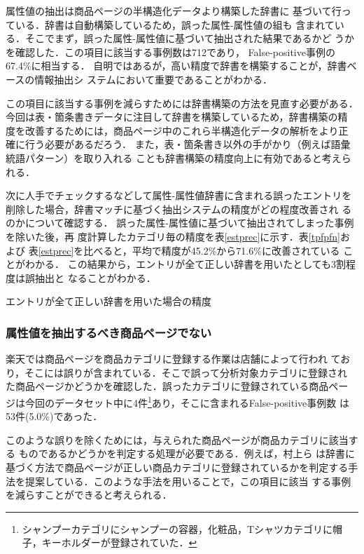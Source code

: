 \documentclass[japanese]{jnlp_1.4}
\begin{document}
属性値の抽出は商品ページの半構造化データより構築した辞書に
基づいて行っている．辞書は自動構築しているため，誤った属性-属性値の組も
含まれている．そこでまず，誤った属性-属性値に基づいて抽出された結果であるかど
うかを確認した．この項目に該当する事例数は712であり，
False-positive事例の67.4\%に相当する．
自明ではあるが，高い精度で辞書を構築することが，辞書ベースの情報抽出シ
ステムにおいて重要であることがわかる．

この項目に該当する事例を減らすためには辞書構築の方法を見直す必要がある．
今回は表・箇条書きデータに注目して辞書を構築しているため，辞書構築の精
度を改善するためには，商品ページ中のこれら半構造化データの解析をより正
確に行う必要があるだろう．
また，表・箇条書き以外の手がかり（例えば語彙統語パターン）を取り入れる
ことも辞書構築の精度向上に有効であると考えられる．

次に人手でチェックするなどして属性-属性値辞書に含まれる誤ったエントリを
削除した場合，辞書マッチに基づく抽出システムの精度がどの程度改善され
るのかについて確認する．
誤った属性-属性値に基づいて抽出されてしまった事例を除いた後，再
度計算したカテゴリ毎の精度を表\ref{estprec}に示す．表\ref{tpfpfn}および
表\ref{estprec}を比べると，平均で精度が45.2\%から71.6\%に改善されている
ことがわかる．
この結果から，エントリが全て正しい辞書を用いたとしても3割程度は誤抽出と
なることがわかる．

\begin{table}[t]
\caption{エントリが全て正しい辞書を用いた場合の精度}
\label{estprec}

\end{table}


\subsubsection{属性値を抽出するべき商品ページでない}
\label{check2}

楽天では商品ページを商品カテゴリに登録する作業は店舗によって行われ
ており，そこには誤りが含まれている．そこで誤って分析対象カテゴリに登録され
た商品ページかどうかを確認した．誤ったカテゴリに登録されている商品ペー
ジは今回のデータセット中に4件\footnote{シャンプーカテゴリにシャンプーの容器，化粧品，Tシャツカテゴリに帽子，キーホルダーが登録されていた．}あり，そこに含まれるFalse-positive事例数
は53件(5.0\%)であった．

このような誤りを除くためには，与えられた商品ページが商品カテゴリに該当する
ものであるかどうかを判定する処理が必要である．例えば，村上ら
\cite{murakami2012}は辞書に基づく方法で商品ページが正しい商品カテゴリに登録されているかを判定する手法を提案している．このような手法を用いることで，この項目に該当
する事例を減らすことができると考えられる．
\end{document}
